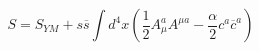 \begin{equation}
S=S_{YM}+s\overline{s}\int d^{4}x\left( \frac{1}{2}A_{\mu }^{a}A^{\mu a}-%
\frac{\alpha }{2}c^{a}\overline{c}^{a}\right)   \label{cfa2}
\end{equation}

